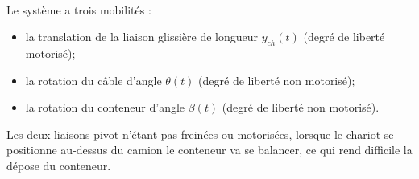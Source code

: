 \begin{corrige} ~\\

Le système a trois mobilités : 
\begin{itemize}
\item la translation de la liaison glissière de longueur $y_{ch}(t)$ (degré de liberté motorisé);
\item la rotation du câble d'angle $\theta(t)$ (degré de liberté non motorisé);
\item la rotation du conteneur d'angle $\beta(t)$ (degré de liberté non motorisé). 
\end{itemize}

Les deux liaisons pivot n'étant pas freinées ou motorisées, lorsque le chariot se positionne au-dessus du camion le conteneur va se balancer, ce qui rend difficile la dépose du conteneur. 

\end{corrige}
\else
\fi

